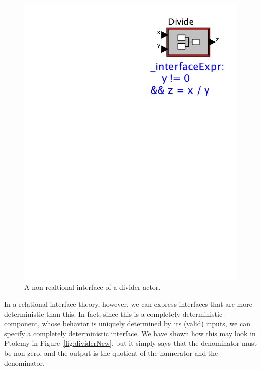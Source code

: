 \documentclass[preprint,11pt]{sigplanconf}
\begin{document}
\begin{figure}[htbp]
\centering
\includegraphics[scale=0.6]{figs/Divide2} %
\caption{A non-realtional interface of a divider actor.}
\label{fig:dividerOld}
\end{figure}
\cite{ptII}
In a relational interface theory, however, we can express interfaces that are
more deterministic than this.  In fact, since this is a completely
deterministic component, whose behavior is uniquely determined by its (valid)
inputs, we can specify a completely deterministic interface.  We have shown how
this may look in Ptolemy in Figure~\ref{fig:dividerNew}, but it simply says
that the denominator must be non-zero, and the output is the quotient of the
numerator and the denominator.
\end{document}
